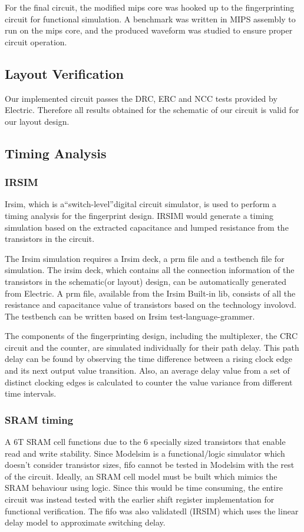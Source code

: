 \documentclass[10pt,journal,compsoc]{IEEEtran}
\begin{document}
For the final circuit, the modified mips core was hooked up to the fingerprinting circuit for functional simulation. A benchmark was written in MIPS assembly to run on the mips core, and the produced waveform was studied to ensure proper circuit operation. 

\subsection{Layout Verification}
Our implemented circuit passes the DRC, ERC and NCC tests provided by Electric. Therefore all results obtained for the schematic of our circuit is valid for our layout design.


\subsection{Timing Analysis}
\subsubsection {\qquad  IRSIM}
Irsim, which is a“switch-level”digital circuit simulator, is used to perform a timing analysis for the fingerprint design. IRSIMl would generate a timing simulation based on the extracted capacitance and lumped resistance from the transistors in the circuit.
    
The Irsim simulation requires a Irsim deck, a prm file and a testbench file for simulation. The irsim deck, which contains all the connection information of the transistors in the schematic(or layout) design, can be automatically generated from Electric. A prm file, available from the Irsim Built-in lib, consists of all the resistance and capacitance value of transistors based on the technology involovd. The testbench can be written based on Irsim test-language-grammer.
    
The components of the fingerprinting design, including the multiplexer, the CRC circuit and the counter, are simulated individually for their path delay. This path delay can be found by observing the time difference between a rising clock edge and its next output value transition. Also, an average delay value from a set of distinct clocking edges is calculated to counter the value variance from different time intervals.

\subsubsection {\qquad  SRAM timing}
A 6T SRAM cell functions due to the 6 specially sized transistors that enable read and write stability. Since Modelsim is a functional/logic simulator which doesn’t consider transistor sizes, fifo cannot be tested in Modelsim with the rest of the circuit. Ideally, an SRAM cell model must be built which mimics the SRAM behaviour using logic. Since this would be time consuming, the entire circuit was instead tested with the earlier shift register implementation for functional verification. The fifo was also validatedl (IRSIM) which uses the linear delay model to approximate switching delay. 
\end{document}
